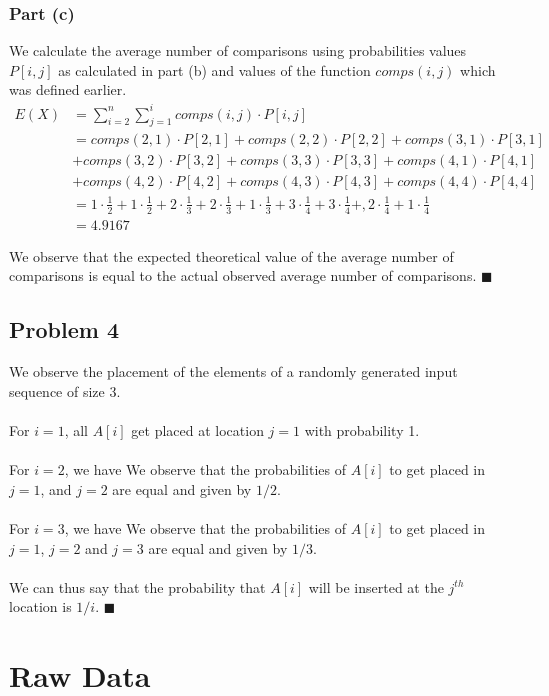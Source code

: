 \documentclass{article}
\begin{document}
\subsubsection{Part (c)}
We calculate the average number of comparisons using probabilities values $P[i,j]$ as calculated in part (b) and values of the function $comps(i,j)$ which was defined earlier.
\begin{align*}
E(X) &= \sum_{i=2}^{n} \sum_{j=1}^{i} comps(i,j) \cdot P[i,j]\\
&= comps(2,1) \cdot P[2,1] + comps(2,2) \cdot P[2,2] + comps(3,1) \cdot P[3,1] \\
&+ comps(3,2) \cdot P[3,2] + comps(3,3) \cdot P[3,3] + comps(4,1) \cdot P[4,1] \\
&+ comps(4,2) \cdot P[4,2] + comps(4,3) \cdot P[4,3] + comps(4,4) \cdot P[4,4]\\
&= 1 \cdot \frac{1}{2} + 1 \cdot \frac{1}{2} + 2 \cdot \frac{1}{3} + 2 \cdot \frac{1}{3} + 1 \cdot \frac{1}{3} + 3 \cdot \frac{1}{4} + 3 \cdot \frac{1}{4} +, 2 \cdot \frac{1}{4} + 1 \cdot \frac{1}{4}\\
&= 4.9167
\end{align*}

We observe that the expected theoretical value of the average number of comparisons is equal to the actual observed average number of comparisons. $\blacksquare$
\subsection{Problem 4}
We observe the placement of the elements of a randomly generated input sequence of size 3.\\\\
For $i=1$, all $A[i]$ get placed at location $j=1$ with probability 1.\\\\
For $i=2$, we have
We observe that the probabilities of $A[i]$ to get placed in $j=1$, and $j=2$ are equal and given by $1/2$.\\\\
For $i=3$, we have
We observe that the probabilities of $A[i]$ to get placed in $j=1$, $j=2$ and $j=3$ are equal and given by $1/3$.\\\\
We can thus say that the probability that $A[i]$ will be inserted at the $j^{th}$ location is $1/i$. $\blacksquare$
\section{Raw Data}
\label{sec:data}
\end{document}
